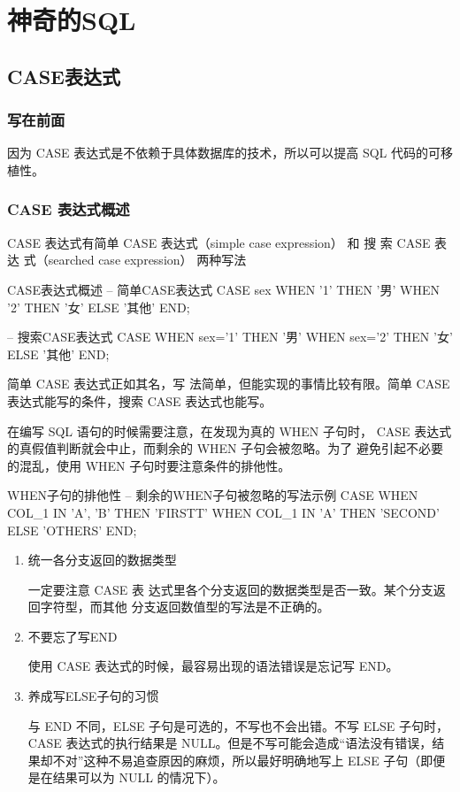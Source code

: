 \chapter{神奇的SQL}
\section{CASE表达式}
\subsection{写在前面}
因为 CASE 表达式是不依赖于具体数据库的技术，所以可以提高 SQL 代码的可移植性。
\subsection{CASE 表达式概述}
CASE 表达式有简单 CASE 表达式（simple case expression） 和 搜 索 CASE 表 达 式（searched case expression）
两种写法
\begin{sql}{CASE表达式概述}
-- 简单CASE表达式 
CASE sex
WHEN '1' THEN '男'
WHEN '2' THEN '女'
ELSE '其他' END;

-- 搜索CASE表达式 
CASE 
WHEN sex='1' THEN '男'
WHEN sex='2' THEN '女'
ELSE '其他' END;
\end{sql}
简单 CASE 表达式正如其名，写
法简单，但能实现的事情比较有限。简单 CASE 表达式能写的条件，搜索
CASE 表达式也能写。

在编写 SQL 语句的时候需要注意，在发现为真的 WHEN 子句时，
CASE 表达式的真假值判断就会中止，而剩余的 WHEN 子句会被忽略。为了
避免引起不必要的混乱，使用 WHEN 子句时要注意条件的排他性。
\begin{sql}{WHEN子句的排他性}
-- 剩余的WHEN子句被忽略的写法示例
CASE 
WHEN COL_1 IN {'A', 'B'} THEN 'FIRSTT'
WHEN COL_1 IN {'A'} THEN 'SECOND'
     ELSE 'OTHERS' END;
\end{sql}
\catutions

\begin{enumerate}
\item 统一各分支返回的数据类型

一定要注意 CASE 表
达式里各个分支返回的数据类型是否一致。某个分支返回字符型，而其他
分支返回数值型的写法是不正确的。

\item 不要忘了写END

使用 CASE 表达式的时候，最容易出现的语法错误是忘记写 END。

\item 养成写ELSE子句的习惯

与 END 不同，ELSE 子句是可选的，不写也不会出错。不写 ELSE 子句时，
CASE 表达式的执行结果是 NULL。但是不写可能会造成“语法没有错误，结果却不对”这种不易追查原因的麻烦，所以最好明确地写上 ELSE 子句（即便
是在结果可以为 NULL 的情况下）。

\end{enumerate}


